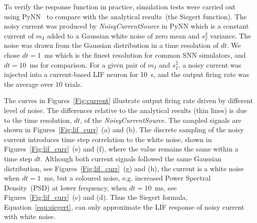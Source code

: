 	To verify the response function in practice, simulation tests were carried out using PyNN~\citep{davison2008pynn} to compare with the analytical results~(the Siegert function).
	The noisy current was produced by \textit{NoisyCurrentSource} in PyNN which is a constant current of $m_I$ added to a Gaussian white noise of zero mean and $s_I^2$ variance.
	The noise was drawn from the Gaussian distribution in a time resolution of $dt$.
	We chose $dt=1$~ms which is the finest resolution for common SNN simulators, and $dt=10$~ms for comparison.
	For a given pair of $m_I$ and $s_I^2$, a noisy current was injected into a current-based LIF neuron for 10~s, and the output firing rate was the average over 10 trials.
	
	The curves in Figures~\ref{Fig:current} illustrate output firing rate driven by different level of noise.
	The differences relative to the analytical results (thin lines) is due to the time resolution, $dt$, of the \textit{NoisyCurrentSource}.
	The sampled signals are shown in Figures~\ref{Fig:lif_curr}~(a) and (b).
	The discrete sampling of the noisy current introduces time step correlation to the white noise, shown in Figures~\ref{Fig:lif_curr}~(e) and (f), where the value remains the same within a time step $dt$.
	Although both current signals followed the same Gaussian distribution, see Figures~\ref{Fig:lif_curr}~(g) and (h), the current is a white noise when $dt=1$~ms, but a coloured noise, e.g. increased Power Spectral Density~(PSD) at lower frequency, when $dt=10$~ms, see Figures~\ref{Fig:lif_curr}~(c) and (d).
	Thus the Siegert formula, Equation~\ref{equ:siegert}, can only approximate the LIF response of noisy current with white noise.


